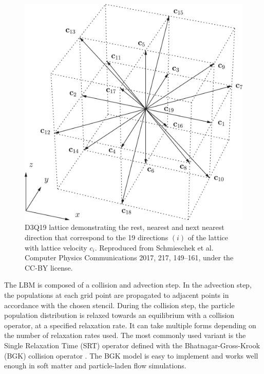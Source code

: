 \begin{figure}[h]
    \centering
    \includegraphics[scale = 1]{figures/methods/d3q19_lattice.jpg}
    \caption{D3Q19 lattice demonstrating the rest, nearest and next nearest direction that correspond to the 19 
    directions $(i)$ of the lattice with lattice velocity $c_{i}$. \cite{schmieschek_lb3d_2017} Reproduced from 
    Schmieschek et al. Computer Physics Communications 2017, 217, 149--161, under the CC-BY license.}
    \label{fig:d3q19_lattice}
\end{figure}

The LBM is composed of a collision and advection step. In the advection step, the populations at each grid point are propagated to adjacent points in accordance 
with the chosen stencil. During the collision step, the particle population distribution is relaxed towards an equilibrium with a collision operator, at a 
specified relaxation rate. It can take multiple forms depending on the number of
relaxation rates used. The most commonly used variant is the Single Relaxation Time (SRT) operator defined with the Bhatnagar-Gross-Krook (BGK) 
collision operator \cite{bhatnagar_model_1954, qian_lattice_1992}. The BGK model is easy to implement and works well enough in soft matter and
particle-laden flow simulations.

